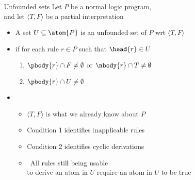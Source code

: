 \begin{frame}{Unfounded sets}
  Let $P$ be a normal logic program,\\ and
  let $\langle T,F \rangle$ be a partial interpretation
  \smallskip
  \begin{itemize}
  \item<2-> A set $U \subseteq \atom{P}$ is an \alert{unfounded set} of $P$
    wrt $\langle T,F \rangle$
  \item<4->[]
    if for each rule $r\in P$ such that $\head{r}\in U$

    \begin{enumerate}\normalsize
    \item<5-> $\pbody{r} \cap F \neq \emptyset$ or $\nbody{r} \cap T \neq \emptyset$
    \item<7-> $\pbody{r} \cap U \neq \emptyset$
    \end{enumerate}
    \medskip
  \item<3->  \
    \begin{itemize}\normalsize
    \item<3-> $\langle T,F \rangle$ is what we already know about $P$
    \item<6-> Condition 1 identifies inapplicable rules
    \item<8-> Condition 2 identifies cyclic derivations
      \smallskip
    \item<9->[]  \
    \alert{All rules still being usable\\ to derive an atom in $U$ require an atom in $U$ to be true}
  \end{itemize}
\end{itemize}
\nocite{gerosc91a}
\end{frame}
